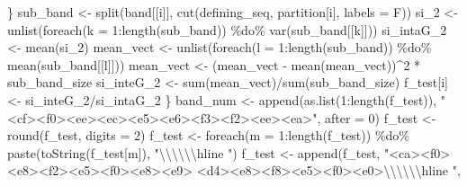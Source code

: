 \documentclass[
]{article}
\newenvironment{Shaded}{\begin{snugshade}}{\end{snugshade}}
\newcommand{\AttributeTok}[1]{\textcolor[rgb]{0.77,0.63,0.00}{#1}}
\newcommand{\DecValTok}[1]{\textcolor[rgb]{0.00,0.00,0.81}{#1}}
\newcommand{\FunctionTok}[1]{\textcolor[rgb]{0.00,0.00,0.00}{#1}}
\newcommand{\NormalTok}[1]{#1}
\newcommand{\OtherTok}[1]{\textcolor[rgb]{0.56,0.35,0.01}{#1}}
\newcommand{\SpecialCharTok}[1]{\textcolor[rgb]{0.00,0.00,0.00}{#1}}
\newcommand{\StringTok}[1]{\textcolor[rgb]{0.31,0.60,0.02}{#1}}
\begin{document}
\begin{Shaded}
\begin{Highlighting}[]
\NormalTok{    \}}
\NormalTok{    sub\_band }\OtherTok{\textless{}{-}} \FunctionTok{split}\NormalTok{(band[[i]], }\FunctionTok{cut}\NormalTok{(defining\_seq, partition[i], }\AttributeTok{labels =}\NormalTok{ F))}
\NormalTok{    si\_2 }\OtherTok{\textless{}{-}} \FunctionTok{unlist}\NormalTok{(}\FunctionTok{foreach}\NormalTok{(}\AttributeTok{k =} \DecValTok{1}\SpecialCharTok{:}\FunctionTok{length}\NormalTok{(sub\_band)) }\SpecialCharTok{\%do\%} \FunctionTok{var}\NormalTok{(sub\_band[[k]]))}
\NormalTok{    si\_intaG\_2 }\OtherTok{\textless{}{-}} \FunctionTok{mean}\NormalTok{(si\_2)}
\NormalTok{    mean\_vect }\OtherTok{\textless{}{-}} \FunctionTok{unlist}\NormalTok{(}\FunctionTok{foreach}\NormalTok{(}\AttributeTok{l =} \DecValTok{1}\SpecialCharTok{:}\FunctionTok{length}\NormalTok{(sub\_band)) }\SpecialCharTok{\%do\%} \FunctionTok{mean}\NormalTok{(sub\_band[[l]]))}
\NormalTok{    mean\_vect }\OtherTok{\textless{}{-}}\NormalTok{ (mean\_vect }\SpecialCharTok{{-}} \FunctionTok{mean}\NormalTok{(mean\_vect))}\SpecialCharTok{\^{}}\DecValTok{2} \SpecialCharTok{*}\NormalTok{ sub\_band\_size}
\NormalTok{    si\_inteG\_2 }\OtherTok{\textless{}{-}} \FunctionTok{sum}\NormalTok{(mean\_vect)}\SpecialCharTok{/}\FunctionTok{sum}\NormalTok{(sub\_band\_size)}
\NormalTok{    f\_test[i] }\OtherTok{\textless{}{-}}\NormalTok{ si\_inteG\_2}\SpecialCharTok{/}\NormalTok{si\_intaG\_2}
\NormalTok{\}}
\NormalTok{band\_num }\OtherTok{\textless{}{-}} \FunctionTok{append}\NormalTok{(}\FunctionTok{as.list}\NormalTok{(}\DecValTok{1}\SpecialCharTok{:}\FunctionTok{length}\NormalTok{(f\_test)), }\StringTok{"\textless{}cf\textgreater{}\textless{}f0\textgreater{}\textless{}ee\textgreater{}\textless{}ec\textgreater{}\textless{}e5\textgreater{}\textless{}e6\textgreater{}\textless{}f3\textgreater{}\textless{}f2\textgreater{}\textless{}ee\textgreater{}\textless{}ea\textgreater{}"}\NormalTok{, }
    \AttributeTok{after =} \DecValTok{0}\NormalTok{)}
\NormalTok{f\_test }\OtherTok{\textless{}{-}} \FunctionTok{round}\NormalTok{(f\_test, }\AttributeTok{digits =} \DecValTok{2}\NormalTok{)}
\NormalTok{f\_test }\OtherTok{\textless{}{-}} \FunctionTok{foreach}\NormalTok{(}\AttributeTok{m =} \DecValTok{1}\SpecialCharTok{:}\FunctionTok{length}\NormalTok{(f\_test)) }\SpecialCharTok{\%do\%} \FunctionTok{paste}\NormalTok{(}\FunctionTok{toString}\NormalTok{(f\_test[m]), }\StringTok{"}\SpecialCharTok{\textbackslash{}\textbackslash{}\textbackslash{}\textbackslash{}\textbackslash{}\textbackslash{}}\StringTok{hline "}\NormalTok{)}
\NormalTok{f\_test }\OtherTok{\textless{}{-}} \FunctionTok{append}\NormalTok{(f\_test, }\StringTok{"\textless{}ca\textgreater{}\textless{}f0\textgreater{}\textless{}e8\textgreater{}\textless{}f2\textgreater{}\textless{}e5\textgreater{}\textless{}f0\textgreater{}\textless{}e8\textgreater{}\textless{}e9\textgreater{} \textless{}d4\textgreater{}\textless{}e8\textgreater{}\textless{}f8\textgreater{}\textless{}e5\textgreater{}\textless{}f0\textgreater{}\textless{}e0\textgreater{}}\SpecialCharTok{\textbackslash{}\textbackslash{}\textbackslash{}\textbackslash{}\textbackslash{}\textbackslash{}}\StringTok{hline "}\NormalTok{, }

\end{Highlighting}
\end{Shaded}
\end{document}
